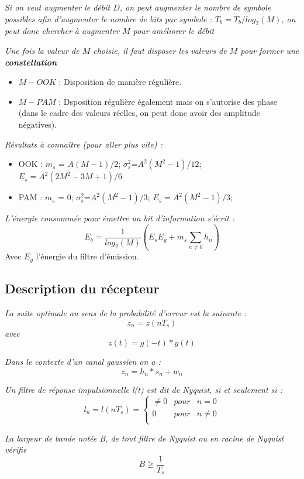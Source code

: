 \begin{pop}
\textit{Si on veut augmenter le débit $D$, on peut augmenter le nombre de symbole possibles afin d'augmenter le nombre de bits par symbole : $T_{b}= T_{b}/log_{2}(M)$, on peut donc chercher à augmenter $M$ pour améliorer le débit}
\end{pop}

\begin{pop}
\textit{Une fois la valeur de $M$ choisie, il faut disposer les valeurs de $M$ pour former une \textbf{constellation}}
\begin{itemize}
\item $M-OOK$ : Disposition de manière régulière.
\item $M-PAM$ : Dsposition régulière également mais on s'autorise des phase (dans le cadre des valeurs réelles, on peut donc avoir des amplitude négatives). 
\end{itemize}
\end{pop}

\begin{pop}
\textit{Résultats à connaître (pour aller plus vite) :}
\begin{itemize}
\item OOK : $m_{s}$ = $A(M-1)/2$;     $\sigma_{s}^{2}$=$A^{2}(M^{2}-1)/12$;     $E_{s}=A^{2}(2M^{2}-3M+1)/6$
\item PAM : $m_{s}$ = 0;    $\sigma_{s}^{2}$=$A^{2}(M^{2}-1)/3$;     $E_{s}=A^{2}(M^{2}-1)/3$;
\end{itemize}
\end{pop}
\begin{pop}
\textit{L'énergie consommée pour émettre un bit d'information s'écrit : }
$$E_{b}=\dfrac{1}{log_{2}(M)} (E_{s}E_{g}+m_{s}\sum_{n\neq 0} h_{n})$$
Avec $E_{g}$ l'énergie du filtre d'émission.
\end{pop}

\subsection{Description du récepteur}
\begin{pop}
\textit{La suite optimale au sens de la probabilité d'erreur est la suivante :}
$$z_{n}=z(nT_{s})$$
\textit{avec}
$$z(t)=g(-t)*y(t)$$
\end{pop}

\begin{pop}
\textit{Dans le contexte d'un canal gaussien on a : }
$$z_{n}=h_{n}*s_{n}+w_{n}$$
\end{pop}

\begin{defn}
\textit{Un filtre de réponse impulsionnelle l(t) est dit de Nyquist, si et seulement si : }
$$l_{n}=l(nT_{s})= 
\left\{
  \begin{array}{rcr}
    \neq 0 & pour &  n=0 \\
    0 & pour & n\neq 0 \\
  \end{array}
\right.
$$
\end{defn}

\begin{pop}
\textit{La largeur de bande notée B, de tout filtre de Nyquist ou en racine de Nyquist vérifie} $$B\geq \dfrac{1}{T_{s}}$$
\end{pop}